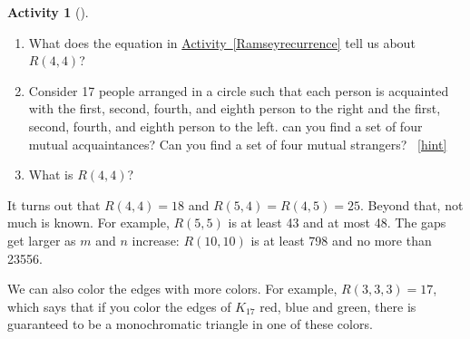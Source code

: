 \documentclass[10pt,]{book}
\theoremstyle{plain}
\theoremstyle{definition}
\theoremstyle{definition}
\theoremstyle{definition}
\newtheorem{activity}[project]{Activity}
\numberwithin{equation}{chapter}
\begin{document}
\begin{activity}[]\label{Ramseybound2}
\leavevmode%
\begin{enumerate}[font=\bfseries,label=(\alph*),ref=\alph*]
\item\label{task-60} \hypertarget{p-425}{}%
What does the equation in \hyperref[Ramseyrecurrence]{Activity~\ref{Ramseyrecurrence}} tell us about \(R(4,4)\)?%
\item\label{task-61} \hypertarget{p-427}{}%
Consider 17 people arranged in a circle such that each person is acquainted with the first, second, fourth, and eighth person to the right and the first, second, fourth, and eighth person to the left.  can you find a set of four mutual acquaintances?  Can you find a set of four mutual strangers?%
~\hfill{\tiny\hyperlink{a-53.b}{[hint]}\hypertarget{q-53.b}{}}\item\label{task-62} \hypertarget{p-430}{}%
What is \(R(4,4)\)?%
\end{enumerate}
\end{activity}
\hypertarget{p-431}{}%
It turns out that \(R(4,4) = 18\) and \(R(5, 4) = R(4,5) = 25\).  Beyond that, not much is known.  For example, \(R(5,5)\) is at least 43 and at most 48.  The gaps get larger as \(m\) and \(n\) increase: \(R(10,10)\) is at least 798 and no more than 23556.%
\par
\hypertarget{p-432}{}%
We can also color the edges with more colors.  For example, \(R(3,3,3) = 17\), which says that if you color the edges of \(K_{17}\) red, blue and green, there is guaranteed to be a monochromatic triangle in one of these colors.%
\typeout{************************************************}
\typeout{************************************************}
\end{document}
